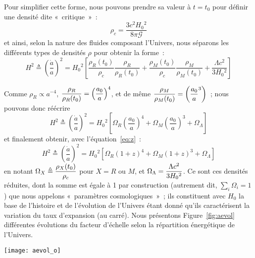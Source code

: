 \documentclass[../main/main.tex]{subfiles}
\begin{document}
Pour simplifier cette forme, nous pouvons prendre sa valeur à $t = t_0$ pour
définir une densité dite «~critique~»~:
\begin{equation}
    \rho_c = \frac{3c^2H_0{}^2}{8\pi\mathcal{G}}
\end{equation}
et ainsi, selon la nature des fluides composant l'Univers, nous séparons les
différents types de densités $\rho$ pour obtenir la forme~:
\begin{equation}
    H^2 \triangleq \left( \frac{\dot{a}}{a} \right)^2 =
    H_0{}^2 \left[ \frac{\rho_R(t_0)}{\rho_c}\frac{\rho_R}{\rho_R(t_0)} +
                   \frac{\rho_M(t_0)}{\rho_c}\frac{\rho_M}{\rho_M(t_0)} +
                   \frac{\Lambda c^2}{3 H_0{}^2}
               \right]
\end{equation}

Comme $\rho_R \propto a^{-4}$, $\displaystyle\frac{\rho_R}{\rho_R(t_0)} =
\left(\frac{a_0}{a}\right)^4$, et de même $\displaystyle\frac{\rho_M}{\rho_M(t_0)} =
\left(\frac{a_0}{a}^3\right)$~;
nous pouvons donc réécrire
\begin{equation}
    H^2 \triangleq \left( \frac{\dot{a}}{a} \right)^2 =
        H_0{}^2 \left[ \Omega_R \left( \frac{a_0}{a} \right)^4 +
                       \Omega_M \left( \frac{a_0}{a} \right)^3 +
                       \Omega_\Lambda \right]
\end{equation}
et finalement obtenir, avec l'équation~\ref{eq:z}~:
\begin{equation}\label{eq:h2}
    H^2 \triangleq \left( \frac{\dot{a}}{a} \right)^2 =
        H_0{}^2 \left[ \Omega_R \left( 1+z \right)^4 +
                       \Omega_M \left( 1+z \right)^3 +
                       \Omega_\Lambda \right]
\end{equation}
en notant $\Omega_X \triangleq \displaystyle \frac{\rho_X(t_0)}{\rho_c}$ pour $X = R$ ou
$M$, et $\Omega_\Lambda = \displaystyle \frac{\Lambda c^2}{3 H_0{}^2}$. Ce sont ces
densités réduites, dont la somme est égale à 1 par construction (autrement dit,
$\sum_i \Omega_i = 1$) que nous appelons «~paramètres cosmologiques~»~; ils
constituent avec $H_0$ la base de l'histoire et de l'évolution de l'Univers
étant donné qu'ils caractérisent la variation du taux d'expansion (au carré).
Nous présentons Figure~\ref{fig:aevol} différentes évolutions du facteur
d'échelle selon la répartition énergétique de l'Univers.

\begin{SCfigure}[1][ht]
    \centering
    \texttt{[image: aevol\_o]}
    \caption[Évolution du facteur d'échelle en fonction de la répartition
    énergétique de l'Univers]{Évolution du facteur d'échelle en fonction de la
        répartition énergétique de l'Univers. Le temps est indiqué par rapport à
        aujourd'hui (facteur d'échelle = 1). Les premiers modèles impliquent un
        Univers en expansion éternelle, le dernier un Univers qui s'effondrera
    sous l'effet de la masse.}\label{fig:aevol}
\end{SCfigure}
\end{document}
